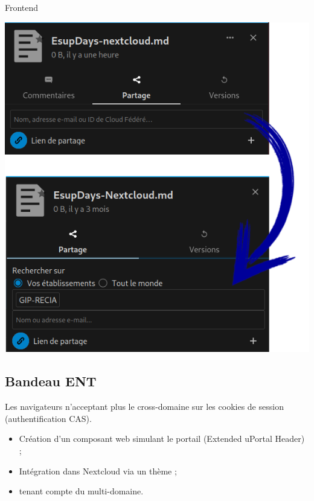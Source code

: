 \begin{frame}[fragile]{\sub}{Frontend}

\includegraphics[height=0.75\textheight]{filesharing.png}
\end{frame}

\subsection{Bandeau ENT}

\begin{frame}{\sub}
Les navigateurs n'acceptant plus le cross-domaine sur les cookies de session (authentification CAS).
\begin{itemize}
	\item Création d'un composant web simulant le portail (Extended uPortal Header) ;
	\item Intégration dans Nextcloud via un thème ;
	\item tenant compte du multi-domaine.  
\end{itemize}
\end{frame}
